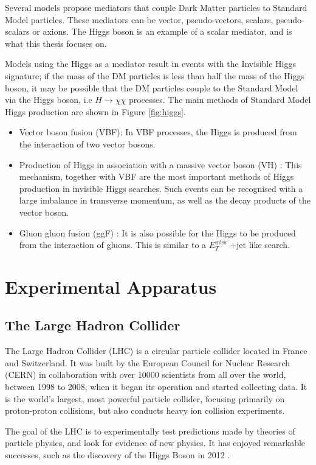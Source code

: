 \documentclass[11pt,a4paper,openright,twoside]{report}
\newcommand{\met}{$E_T^{\mathrm{miss}}$ }
\begin{document}
Several models propose mediators that couple Dark Matter particles to Standard Model particles. These mediators can be vector, pseudo-vectors, scalars, pseudo-scalars or axions. The Higgs boson is an example of a scalar mediator, and is what this thesis focuses on. 

Models using the Higgs as a mediator result in events with the Invisible Higgs signature; if the mass of the DM particles is less than half the mass of the Higgs boson, it may be possible that the DM particles couple to the Standard Model via the Higgs boson, i.e $H\to\chi\chi$ processes. The main methods of Standard Model Higgs production are shown in Figure \ref{fig:higgs}.
	\begin{itemize}
	\item Vector boson fusion (VBF): In VBF processes, the Higgs is produced from the interaction of two vector bosons.
	\item Production of Higgs in association with a massive vector boson (VH) : This mechanism, together with VBF are the most important methods of Higgs production in invisible Higgs searches. Such events can be recognised with a large imbalance in transverse momentum, as well as the decay products of the vector boson.
	\item Gluon gluon fusion (ggF) : It is also possible for the Higgs to be produced from the interaction of gluons. This is similar to a \met+jet like search.
	\end{itemize}

\chapter{Experimental Apparatus}\label{ch:LHC}

\section{The Large Hadron Collider}
The Large Hadron Collider (LHC) is a circular particle collider located in France and Switzerland. It was built by the European Council for Nuclear Research (CERN) in collaboration with over 10000 scientists from all over the world, between 1998 to 2008, when it began its operation and started collecting data. It is the world's largest, most powerful particle collider, focusing primarily on proton-proton collisions, but also conducts heavy ion collision experiments.

The goal of the LHC is to experimentally test predictions made by theories of particle physics, and look for evidence of new physics. It has enjoyed remarkable successes, such as the discovery of the Higgs Boson in 2012 \cite{Higgs,Higgs2}.
\end{document}
